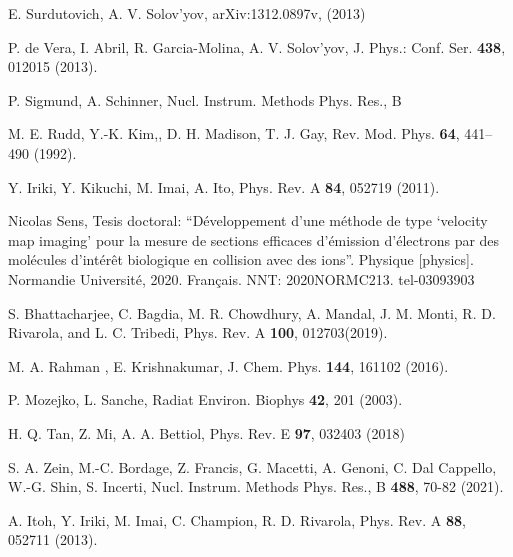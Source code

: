 \begin{thebibliography}{9}
E. Surdutovich, A. V. Solov'yov, 
arXiv:1312.0897v, (2013)

P. de Vera, I. Abril, R. Garcia-Molina, A. V. Solov'yov,
J. Phys.: Conf. Ser. \textbf{438}, 012015 (2013).

P. Sigmund, A. Schinner,
Nucl. Instrum. Methods Phys. Res., B \textbf{}

M. E. Rudd, Y.-K. Kim,, D. H. Madison, T. J. Gay,
Rev. Mod. Phys. \textbf{64}, 441--490 (1992).

Y. Iriki, Y. Kikuchi, M. Imai, A. Ito,
Phys. Rev. A \textbf{84}, 052719 (2011).

Nicolas Sens, Tesis doctoral:
``Développement d’une méthode de type `velocity map imaging' pour la 
mesure de sections efficaces d’émission d’électrons par des molécules 
d’intérêt biologique en collision avec des ions''. 
Physique [physics]. Normandie Université, 2020. Français. 
NNT: 2020NORMC213. tel-03093903

S. Bhattacharjee, C. Bagdia, M. R. Chowdhury, A. Mandal, J. M. Monti, 
R. D. Rivarola, and L. C. Tribedi, 
Phys. Rev. A \textbf{100}, 012703(2019).

M. A. Rahman , E. Krishnakumar,
J. Chem. Phys. \textbf{144}, 161102 (2016).

P. Mozejko, L. Sanche, 
Radiat Environ. Biophys \textbf{42}, 201 (2003).

H. Q. Tan, Z. Mi, A. A. Bettiol, 
Phys. Rev. E \textbf{97}, 032403 (2018)

S. A. Zein, M.-C. Bordage, Z. Francis, G. Macetti, A. Genoni, 
C. Dal Cappello, W.-G. Shin, S. Incerti,
Nucl. Instrum. Methods Phys. Res., B \textbf{488}, 70-82 (2021).

A. Itoh, Y. Iriki, M. Imai, C. Champion, R. D. Rivarola, 
Phys. Rev. A \textbf{88}, 052711 (2013).


\end{thebibliography}

